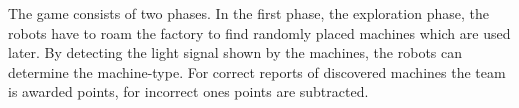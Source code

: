 \documentclass[a4paper,11pt]{article}
\newcommand{\reffig}[1]{Figure~\ref{#1}}
\begin{document}
The game consists of two phases. In the first phase, the exploration
phase, the robots have to roam the factory to find randomly placed
machines which are used later. By detecting the light signal shown by
the machines, the robots can determine the machine-type. For correct
reports of discovered machines the team is awarded points, for
incorrect ones points are subtracted.


\end{document}
